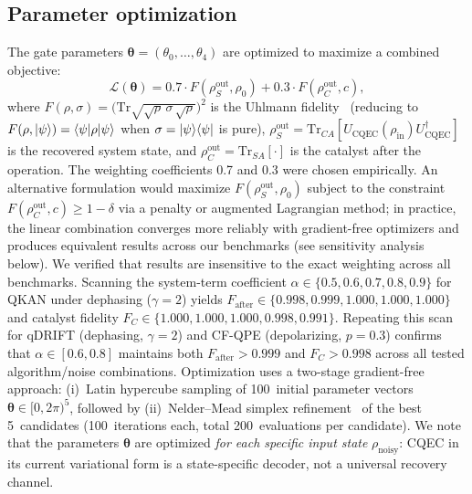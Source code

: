 \documentclass[prx,twocolumn,superscriptaddress,longbibliography,floatfix]{revtex4-2}
\begin{document}
\subsection{Parameter optimization}
\label{sec:optimization}

The gate parameters $\boldsymbol{\theta} = (\theta_0, \ldots, \theta_4)$ are optimized to maximize a combined objective:
\begin{equation}
\mathcal{L}(\boldsymbol{\theta}) = 0.7 \cdot F(\rho_S^\mathrm{out}, \rho_0) + 0.3 \cdot F(\rho_C^\mathrm{out}, c),
\label{eq:objective}
\end{equation}
where $F(\rho, \sigma) = \bigl(\mathrm{Tr}\sqrt{\sqrt{\rho}\,\sigma\,\sqrt{\rho}}\bigr)^2$ is the Uhlmann fidelity~\cite{Jozsa1994} (reducing to $F(\rho, \ket{\psi}) = \braket{\psi|\rho|\psi}$ when $\sigma = \ket{\psi}\!\bra{\psi}$ is pure), $\rho_S^\mathrm{out} = \mathrm{Tr}_{CA}[U_\mathrm{CQEC}(\rho_\mathrm{in})U_\mathrm{CQEC}^\dagger]$ is the recovered system state, and $\rho_C^\mathrm{out} = \mathrm{Tr}_{SA}[\cdot]$ is the catalyst after the operation.
The weighting coefficients 0.7 and 0.3 were chosen empirically.
An alternative formulation would maximize $F(\rho_S^\mathrm{out}, \rho_0)$ subject to the constraint $F(\rho_C^\mathrm{out}, c) \geq 1 - \delta$ via a penalty or augmented Lagrangian method; in practice, the linear combination converges more reliably with gradient-free optimizers and produces equivalent results across our benchmarks (see sensitivity analysis below).
We verified that results are insensitive to the exact weighting across all benchmarks.
Scanning the system-term coefficient $\alpha \in \{0.5, 0.6, 0.7, 0.8, 0.9\}$ for QKAN under dephasing ($\gamma = 2$) yields $F_\mathrm{after} \in \{0.998, 0.999, 1.000, 1.000, 1.000\}$ and catalyst fidelity $F_C \in \{1.000, 1.000, 1.000, 0.998, 0.991\}$.
Repeating this scan for qDRIFT (dephasing, $\gamma = 2$) and CF-QPE (depolarizing, $p = 0.3$) confirms that $\alpha \in [0.6, 0.8]$ maintains both $F_\mathrm{after} > 0.999$ and $F_C > 0.998$ across all tested algorithm/noise combinations.
Optimization uses a two-stage gradient-free approach: (i)~Latin hypercube sampling of 100~initial parameter vectors $\boldsymbol{\theta} \in [0, 2\pi)^5$, followed by (ii)~Nelder--Mead simplex refinement~\cite{NelderMead1965} of the best 5~candidates (100~iterations each, total 200~evaluations per candidate).
We note that the parameters $\boldsymbol{\theta}$ are optimized \emph{for each specific input state} $\rho_\mathrm{noisy}$: CQEC in its current variational form is a state-specific decoder, not a universal recovery channel.
\end{document}
